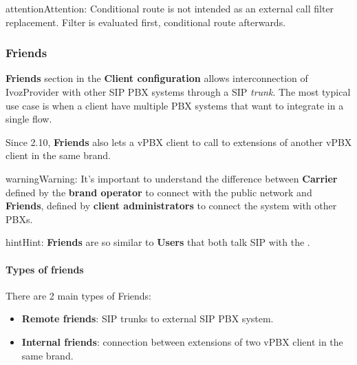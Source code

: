 \documentclass[letterpaper,10pt,english]{sphinxmanual}
\begin{document}
\begin{notice}{attention}{Attention:}
Conditional route is not intended as an external call filter
replacement. Filter is evaluated first, conditional route afterwards.
\end{notice}


\subsubsection{Friends}
\label{administration_portal/client/vpbx/routing_endpoints/friends/index:friends}\label{administration_portal/client/vpbx/routing_endpoints/friends/index::doc}\label{administration_portal/client/vpbx/routing_endpoints/friends/index:id1}
\textbf{Friends} section in the \textbf{Client configuration} allows interconnection of
IvozProvider with other SIP PBX systems through a SIP \emph{trunk}. The most typical
use case is when a client have multiple PBX systems that want to integrate in
a single flow.

Since 2.10, \textbf{Friends} also lets a vPBX client to call to extensions of another
vPBX client in the same brand.

\begin{notice}{warning}{Warning:}
It's important to understand the difference between \textbf{Carrier}
defined by the \textbf{brand operator} to connect with the public network
and \textbf{Friends}, defined by \textbf{client administrators} to connect the
system with other PBXs.
\end{notice}

\begin{notice}{hint}{Hint:}
\textbf{Friends} are so similar to \textbf{Users} that both talk SIP with the
{\hyperref[administration_portal/platform/infrastructure/proxy_users:proxyusers]{}}.
\end{notice}


\paragraph{Types of friends}
\label{administration_portal/client/vpbx/routing_endpoints/friends/index:types-of-friends}
There are 2 main types of Friends:
\begin{itemize}
\item {} 
\textbf{Remote friends}: SIP trunks to external SIP PBX system.

\item {} 
\textbf{Internal friends}: connection between extensions of two vPBX client in the same brand.

\end{itemize}
\end{document}
